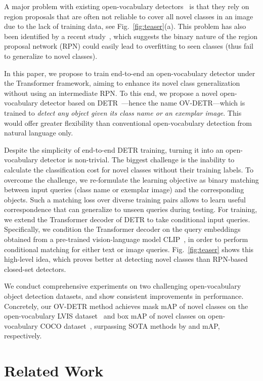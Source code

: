 \documentclass[runningheads]{llncs}
\newcommand{\methodname}{OV-DETR\xspace}
\begin{document}
A major problem with existing open-vocabulary detectors~\cite{zareian2021open,gu2021open} is that they rely on region proposals that are often not reliable to cover all novel classes in an image due to the lack of training data, see Fig.~\ref{fig:teaser}(a). This problem has also been identified by a recent study~\cite{kim2021learning}, which suggests the binary nature of the region proposal network (RPN) could easily lead to overfitting to seen classes (thus fail to generalize to novel classes).

In this paper, we propose to train end-to-end an open-vocabulary detector under the Transformer framework, aiming to enhance its novel class generalization without using an intermediate RPN. To this end, we propose a novel open-vocabulary detector based on DETR~\cite{carion2020end}---hence the name OV-DETR---which is trained to \emph{detect any object given its class name or an exemplar image}. This would offer greater flexibility than conventional open-vocabulary detection from natural language only.

Despite the simplicity of end-to-end DETR training, turning it into an open-vocabulary detector is non-trivial. The biggest challenge is the inability to calculate the classification cost for novel classes without their training labels. To overcome the challenge, we re-formulate the learning objective as binary matching between input queries (class name or exemplar image) and the corresponding objects. Such a matching loss over diverse training pairs allows to learn useful correspondence that can generalize to unseen queries during testing. For training, we extend the Transformer decoder of DETR to take conditional input queries. Specifically, we condition the Transformer decoder on the query embeddings obtained from a pre-trained vision-language model CLIP~\cite{radford2021learning}, in order to perform conditional matching for either text or image queries. Fig.~\ref{fig:teaser} shows this high-level idea, which proves better at detecting novel classes than RPN-based closed-set detectors.

We conduct comprehensive experiments on two challenging
open-vocabulary object detection datasets, and show consistent improvements in performance. Concretely, our \methodname method achieves  mask mAP of novel classes on the open-vocabulary LVIS dataset~\cite{gu2021open} and  box mAP of novel classes on open-vocabulary COCO dataset~\cite{zareian2021open}, surpassing SOTA methods by  and  mAP, respectively. \section{Related Work}
\end{document}
